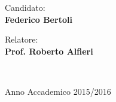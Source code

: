 \begin{titlepage}
\begin{center}
\begin{Large}
      \vspace{0.8cm}
      
      
		  \begin{flushleft}
		    Candidato: \\
		    \textbf{Federico Bertoli} \\
		  \end{flushleft}
	  \vspace{0.8cm}
	  
	  \begin{minipage}{.45\linewidth}
		  \begin{flushleft}
		    {\small Relatore:} \\
		    \textbf{\small{Prof. Roberto Alfieri}}
		  \end{flushleft}
	  \end{minipage}
	  \hfill
	  \begin{minipage}{.45\linewidth}
		  \begin{flushright}
		    {\small \ } \\
		    \textbf{\small{}}
		  \end{flushright}
	   \end{minipage}
      
      \vspace{0.8cm}
      
      Anno Accademico 2015/2016
    \end{Large}

  \end{center}

\end{titlepage}
